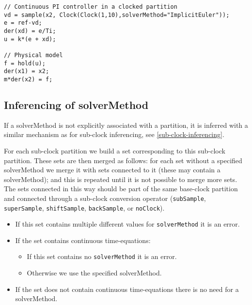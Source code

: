 \begin{example}
\begin{lstlisting}[language=modelica]
// Continuous PI controller in a clocked partition
vd = sample(x2, Clock(Clock(1,10),solverMethod="ImplicitEuler"));
e = ref-vd;
der(xd) = e/Ti;
u = k*(e + xd);

// Physical model
f = hold(u);
der(x1) = x2;
m*der(x2) = f;
\end{lstlisting}
\end{example}

\subsection{Inferencing of solverMethod}\label{inferencing-of-solvermethod}

If a solverMethod is not explicitly associated with a partition, it is
inferred with a similar mechanism as for sub-clock inferencing, see
\cref{sub-clock-inferencing}.

For each sub-clock partition we build a set corresponding to this sub-clock partition.
These sets are then merged as follows: for each set without a specified solverMethod we merge it
with sets connected to it (these may contain a solverMethod); and this is repeated until it is not possible to merge more sets.
The sets connected in this way should be part of the same base-clock partition and connected through a sub-clock conversion operator
(\lstinline!subSample!, \lstinline!superSample!, \lstinline!shiftSample!, \lstinline!backSample!, or \lstinline!noClock!).

\begin{itemize}
\item If this set contains multiple different values for \lstinline!solverMethod! it is an error.
\item If the set contains continuous time-equations:
\begin{itemize}
\item If this set contains no \lstinline!solverMethod! it is an error.
\item Otherwise we use the specified solverMethod.
\end{itemize}
\item If the set does not contain continuous time-equations there is no need for a solverMethod.
\end{itemize}

